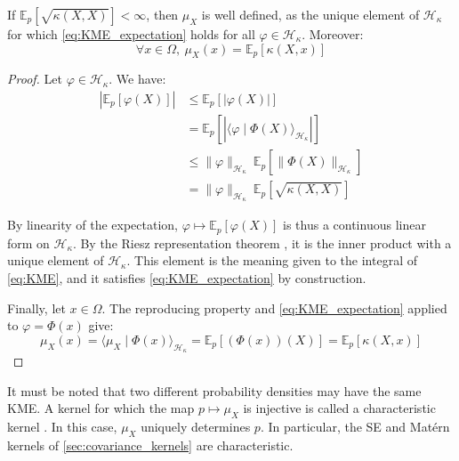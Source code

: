 \begin{proposition}\label{th:KME_existence}
	If $\mathbb{E}_p\left[\sqrt{\kappa(X,X)}\right]<\infty$, then $\mu_X$ is well defined, as the unique element of $\mathcal{H}_\kappa$ for which \eqref{eq:KME_expectation} holds for all $\varphi\in\mathcal{H}_\kappa$. Moreover:
	\begin{equation}
		\forall x\in\Omega,\:\mu_X(x)=\mathbb{E}_p\left[\kappa(X,x)\right]
	\end{equation}
\end{proposition}

\begin{proof}
	Let $\varphi\in\mathcal{H}_\kappa$. We have:
	\begin{equation}
		\begin{aligned}
		\left|\mathbb{E}_p\left[\varphi(X)\right]\right|&\leq\mathbb{E}_p\left[\left|\varphi(X)\right|\right]\\
		&=\mathbb{E}_p\left[\left|\langle\varphi\mid\Phi(X)\rangle_{\mathcal{H}_\kappa}\right|\right]\\
		&\leq\|\varphi\|_{\mathcal{H}_\kappa}\:\mathbb{E}_p\left[\|\Phi(X)\|_{\mathcal{H}_\kappa}\right]\\
		&=\|\varphi\|_{\mathcal{H}_\kappa}\:\mathbb{E}_p\left[\sqrt{\kappa(X,X)}\right]
		\end{aligned}
	\end{equation}

	By linearity of the expectation, $\varphi\mapsto\mathbb{E}_p\left[\varphi(X)\right]$ is thus a continuous linear form on $\mathcal{H}_\kappa$. By the Riesz representation theorem \cite{bib:Riesz}, it is the inner product with a unique element of $\mathcal{H}_\kappa$. This element is the meaning given to the integral of \eqref{eq:KME}, and it satisfies \eqref{eq:KME_expectation} by construction.

	Finally, let $x\in\Omega$. The reproducing property and \eqref{eq:KME_expectation} applied to $\varphi=\Phi(x)$ give:
	\begin{equation}
		\mu_X(x)=\langle\mu_X\mid\Phi(x)\rangle_{\mathcal{H}_\kappa}=\mathbb{E}_p\left[(\Phi(x))(X)\right]=\mathbb{E}_p\left[\kappa(X,x)\right]
	\end{equation}
\end{proof}

It must be noted that two different probability densities may have the same KME. A kernel for which the map $p\mapsto\mu_X$ is injective is called a characteristic kernel \cite{bib:characteristic-kernels}. In this case, $\mu_X$ uniquely determines $p$. In particular, the SE and Matérn kernels of \cref{sec:covariance_kernels} are characteristic.

